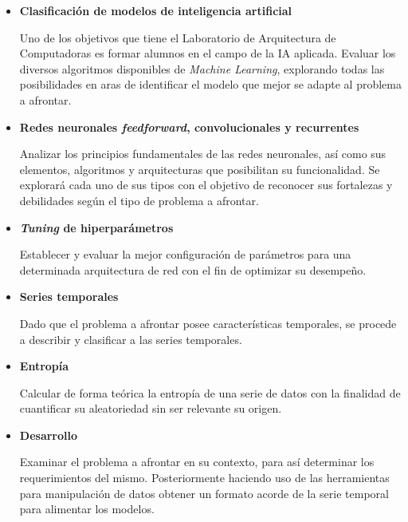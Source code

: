 \documentclass[a4paper,12pt]{article}
\begin{document}
\begin{itemize}
	\item \textbf{Clasificación de modelos de inteligencia artificial}
	      	
	      Uno de los objetivos que tiene el Laboratorio de Arquitectura de Computadoras es formar alumnos en el campo de la IA aplicada. Evaluar los diversos algoritmos disponibles de \textit{Machine Learning}, explorando todas las posibilidades en aras de identificar el modelo que mejor se adapte al problema a afrontar.
	      	
	\item \textbf{Redes neuronales \textit{feedforward}, convolucionales y recurrentes}
	      	
	      Analizar los principios fundamentales de las redes neuronales, así como sus elementos, algoritmos y arquitecturas que posibilitan su funcionalidad. Se explorará cada uno de sus tipos con el objetivo de reconocer sus fortalezas y debilidades según el tipo de problema a afrontar.
	      	
	\item \textbf{\textit{Tuning} de hiperparámetros}
	      	
	      Establecer y evaluar la mejor configuración de parámetros para una determinada arquitectura de red con el fin de optimizar su desempeño.
	      	
	\item \textbf{Series temporales}
	      	
	      Dado que el problema a afrontar posee características temporales, se procede a describir y clasificar a las series temporales.
	      	
	\item \textbf{Entropía}
	      	
	      Calcular de forma teórica la entropía de una serie de datos con la finalidad de cuantificar su aleatoriedad sin ser relevante su origen.
	      	
	\item \textbf{Desarrollo}
	      	
	      Examinar el problema a afrontar en su contexto, para así determinar los requerimientos del mismo. Posteriormente haciendo uso de las herramientas para manipulación de datos obtener un formato acorde de la serie temporal para alimentar los modelos.
	      	
\end{itemize}

\clearpage
\end{document}
